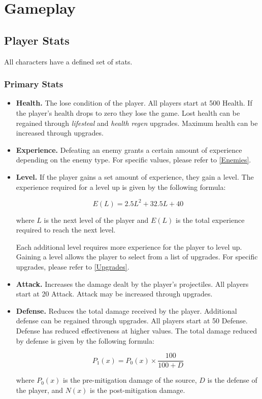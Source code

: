 \documentclass[10pt, a4paper]{article}
\begin{document}
  \twocolumn
  	\section{Gameplay}
  	
  	\subsection{Player Stats} \label{Player Stats}
  	
  	All characters have a defined set of stats.
  	
  	\subsubsection{Primary Stats}
  	
  	\begin{itemize}
  	\item \textbf{Health.} The lose condition of the player. All players start at 500 Health. If the player's health drops to zero they lose the game. Lost health can be regained through \textit{lifesteal} and \textit{health regen} upgrades. Maximum health can be increased through upgrades.

  	\item \textbf{Experience.} Defeating an enemy grants a certain amount of experience depending on the enemy type. For specific values, please refer to \ref{Enemies}. 
  	
  	\item \textbf{Level.} If the player gains a set amount of experience, they gain a level. The experience required for a level up is given by the following formula:
  	
  	\[E(L) = 2.5L^2 + 32.5L + 40\]
  	
  	where $L$ is the next level of the player and $E(L)$ is the total experience required to reach the next level.
  	
  	Each additional level requires more experience for the player to level up. Gaining a level allows the player to select from a list of upgrades. For specific upgrades, please refer to \ref{Upgrades}.
  	
  	\item \textbf{Attack.} Increases the damage dealt by the player's projectiles. All players start at 20 Attack. Attack may be increased through upgrades.

  	\item\textbf{Defense.} Reduces the total damage received by the player. Additional defense can be regained through upgrades. All players start at 50 Defense. Defense has reduced effectiveness at higher values. The total damage reduced by defense is given by the following formula:
  	
  	\[P_1(x) = P_0(x) \times \frac{100}{100+D}\]
  	
  	where $P_0(x)$ is the pre-mitigation damage of the source, $D$ is the defense of the player, and $N(x)$ is the post-mitigation damage.
  	
  	\end{itemize}
  	
\end{document}
